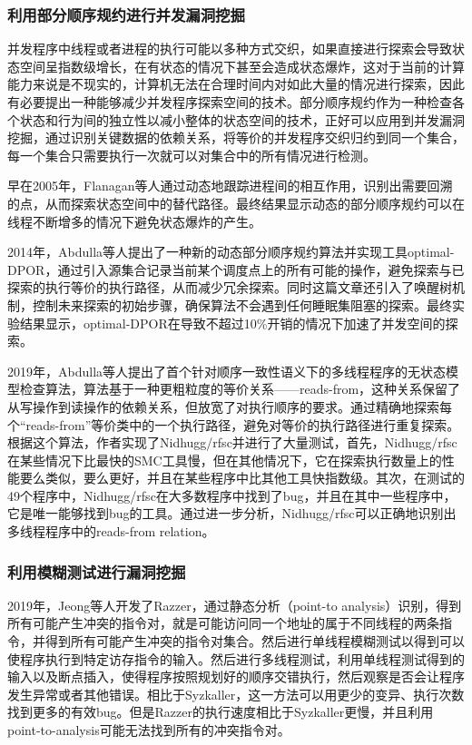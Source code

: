 \subsubsection{利用部分顺序规约进行并发漏洞挖掘}

并发程序中线程或者进程的执行可能以多种方式交织，如果直接进行探索会导致状态空间呈指数级增长，在有状态的情况下甚至会造成状态爆炸，这对于当前的计算能力来说是不现实的，计算机无法在合理时间内对如此大量的情况进行探索，因此有必要提出一种能够减少并发程序探索空间的技术。部分顺序规约作为一种检查各个状态和行为间的独立性以减小整体的状态空间的技术，正好可以应用到并发漏洞挖掘，通过识别关键数据的依赖关系，将等价的并发程序交织归约到同一个集合，每一个集合只需要执行一次就可以对集合中的所有情况进行检测。

早在2005年，Flanagan\cite{flanagan2005dynamic}等人通过动态地跟踪进程间的相互作用，识别出需要回溯的点，从而探索状态空间中的替代路径。最终结果显示动态的部分顺序规约可以在线程不断增多的情况下避免状态爆炸的产生。

2014年，Abdulla\cite{abdulla2014optimal}等人提出了一种新的动态部分顺序规约算法并实现工具optimal-DPOR，通过引入源集合记录当前某个调度点上的所有可能的操作，避免探索与已探索的执行等价的执行路径，从而减少冗余探索。同时这篇文章还引入了唤醒树机制，控制未来探索的初始步骤，确保算法不会遇到任何睡眠集阻塞的探索。最终实验结果显示，optimal-DPOR在导致不超过10\%开销的情况下加速了并发空间的探索。

2019年，Abdulla\cite{abdulla2019optimal}等人提出了首个针对顺序一致性语义下的多线程程序的无状态模型检查算法，算法基于一种更粗粒度的等价关系——reads-from，这种关系保留了从写操作到读操作的依赖关系，但放宽了对执行顺序的要求。通过精确地探索每个“reads-from”等价类中的一个执行路径，避免对等价的执行路径进行重复探索。根据这个算法，作者实现了Nidhugg/rfsc并进行了大量测试，首先，Nidhugg/rfsc在某些情况下比最快的SMC工具慢，但在其他情况下，它在探索执行数量上的性能要么类似，要么更好，并且在某些程序中比其他工具快指数级。其次，在测试的49个程序中，Nidhugg/rfsc在大多数程序中找到了bug，并且在其中一些程序中，它是唯一能够找到bug的工具。通过进一步分析，Nidhugg/rfsc可以正确地识别出多线程程序中的reads-from relation。

\subsubsection{利用模糊测试进行漏洞挖掘}

2019年，Jeong\cite{jeong2019razzer}等人开发了Razzer，通过静态分析（point-to analysis）识别，得到所有可能产生冲突的指令对，就是可能访问同一个地址的属于不同线程的两条指令，并得到所有可能产生冲突的指令对集合。然后进行单线程模糊测试以得到可以使程序执行到特定访存指令的输入。然后进行多线程测试，利用单线程测试得到的输入以及断点插入，使得程序按照规划好的顺序交错执行，然后观察是否会让程序发生异常或者其他错误。相比于Syzkaller，这一方法可以用更少的变异、执行次数找到更多的有效bug。但是Razzer的执行速度相比于Syzkaller更慢，并且利用point-to-analysis可能无法找到所有的冲突指令对。

